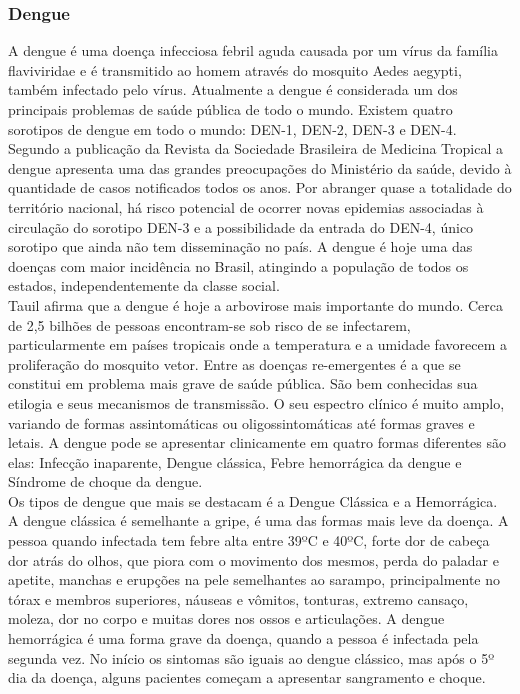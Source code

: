 \documentclass[conference]{IEEEtran}
\begin{document}
\subsubsection{Dengue}
A dengue é uma doença infecciosa febril aguda causada por um vírus da família flaviviridae e é transmitido ao homem através do mosquito Aedes aegypti, também infectado pelo vírus. Atualmente a dengue é considerada um dos principais problemas de saúde pública de todo o mundo. Existem quatro sorotipos de dengue em todo o mundo: DEN-1, DEN-2, DEN-3  e DEN-4.\\
\indent Segundo a publicação da Revista da Sociedade Brasileira de Medicina Tropical\cite{penna2008influence} a dengue apresenta uma das grandes preocupações do Ministério da saúde, devido à quantidade de casos notificados todos os anos. Por abranger quase a totalidade do território nacional, há risco potencial de ocorrer novas epidemias associadas à circulação do sorotipo DEN-3 e a possibilidade da entrada do DEN-4, único sorotipo que ainda não tem disseminação no país.
A dengue é hoje uma das doenças com maior incidência no Brasil, atingindo a população de todos os estados, independentemente da classe social.\\
\indent Tauil \cite{tauil2002critical} afirma que a dengue é hoje a arbovirose mais importante do mundo. Cerca de 2,5 bilhões de pessoas encontram-se sob risco de se infectarem, particularmente em países tropicais onde a temperatura e a umidade favorecem a proliferação do mosquito vetor. Entre as doenças re-emergentes é a que se constitui em problema mais grave de saúde pública. São bem conhecidas sua etilogia e seus mecanismos de transmissão. O seu espectro clínico é muito amplo, variando de formas assintomáticas ou oligossintomáticas até formas graves  e letais. A dengue pode se apresentar clinicamente em quatro formas diferentes são elas: Infecção inaparente, Dengue clássica, Febre hemorrágica da dengue e Síndrome de choque da dengue.\\
\indent Os tipos de dengue que mais se destacam é a Dengue Clássica e a Hemorrágica. A dengue clássica é semelhante a gripe, é uma das formas mais leve da doença. A pessoa quando infectada tem febre alta entre 39ºC e 40ºC, forte dor de cabeça dor atrás do olhos, que piora com o movimento dos mesmos, perda do paladar e apetite, manchas e erupções na pele semelhantes ao sarampo, principalmente no tórax e membros superiores, náuseas e vômitos, tonturas, extremo cansaço, moleza, dor no corpo e muitas dores nos ossos e articulações. A dengue hemorrágica é uma forma grave da doença, quando a pessoa é infectada pela segunda vez. No início os sintomas são iguais ao dengue clássico, mas após o 5º dia da doença, alguns pacientes começam a apresentar sangramento e choque.\\
\end{document}
